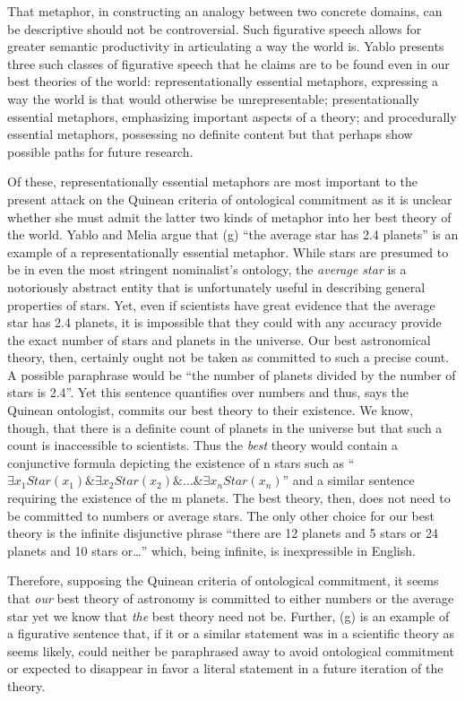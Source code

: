 \documentclass[12pt,a4paper]{article}
\begin{document}
That metaphor, in constructing an analogy between two concrete
domains, can be descriptive should not be controversial.  Such
figurative speech allows for greater semantic productivity in
articulating a way the world is. Yablo presents three such classes of
figurative speech that he claims are to be found even in our best
theories of the world: representationally essential metaphors,
expressing a way the world is that would otherwise be unrepresentable;
presentationally essential metaphors, emphasizing important aspects of
a theory; and procedurally essential metaphors, possessing no definite
content but that perhaps show possible paths for future research.

Of these, representationally essential metaphors are most important to
the present attack on the Quinean criteria of ontological commitment
as it is unclear whether she must admit the latter two kinds of
metaphor into her best theory of the world.  Yablo and Melia argue
that (g) ``the average star has 2.4 planets'' is an example of a
representationally essential metaphor.  While stars are presumed to be
in even the most stringent nominalist's ontology, the \emph{average
  star} is a notoriously abstract entity that is unfortunately useful
in describing general properties of stars.  Yet, even if scientists
have great evidence that the average star has 2.4 planets, it is
impossible that they could with any accuracy provide the exact number
of stars and planets in the universe. Our best astronomical theory,
then, certainly ought not be taken as committed to such a precise
count. A possible paraphrase would be ``the number of planets divided
by the number of stars is 2.4''.  Yet this sentence quantifies over
numbers and thus, says the Quinean ontologist, commits our best theory
to their existence.  We know, though, that there is a definite count
of planets in the universe but that such a count is inaccessible to
scientists. Thus the \emph{best} theory would contain a conjunctive
formula depicting the existence of n stars such as ``$\exists
x_1Star(x_1) \& \exists x_2Star(x_2) \& \ldots \& \exists
x_nStar(x_n)$'' and a similar sentence requiring the existence of the
m planets. The best theory, then, does not need to be committed to
numbers or average stars.  The only other choice for our best theory
is the infinite disjunctive phrase ``there are 12 planets and 5 stars
or 24 planets and 10 stars or\ldots'' which, being infinite, is
inexpressible in English.  

Therefore, supposing the Quinean criteria of ontological commitment,
it seems that \emph{our} best theory of astronomy is committed to
either numbers or the average star yet we know that \emph{the} best
theory need not be. Further, (g) is an example of a figurative
sentence that, if it or a similar statement was in a scientific theory
as seems likely, could neither be paraphrased away to avoid
ontological commitment or expected to disappear in favor a literal
statement in a future iteration of the theory.
\end{document}
